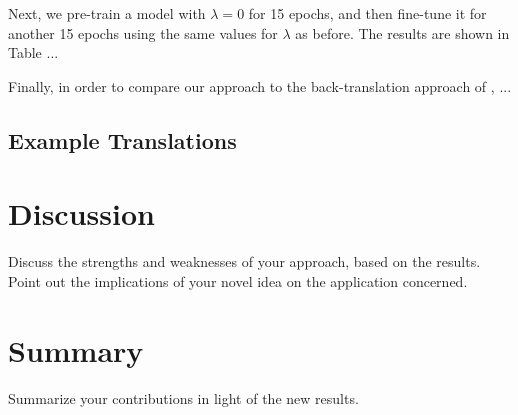 \documentclass[11pt,a4paper]{article}
\begin{document}
Next, we pre-train a model with $\lambda=0$ for 15 epochs, and then fine-tune it for another 15 epochs using the same values for $\lambda$ as before. The results are shown in Table ...

Finally, in order to compare our approach to the back-translation approach of \citet{backtrans}, ...
\subsection{Example Translations}
\section{Discussion}\label{sec:discussion}
Discuss the strengths and weaknesses of your approach, based on the results. Point out the implications of your novel idea on the application concerned.
\section{Summary}\label{sec:conclusions}
Summarize your contributions in light of the new results.

\end{document}
